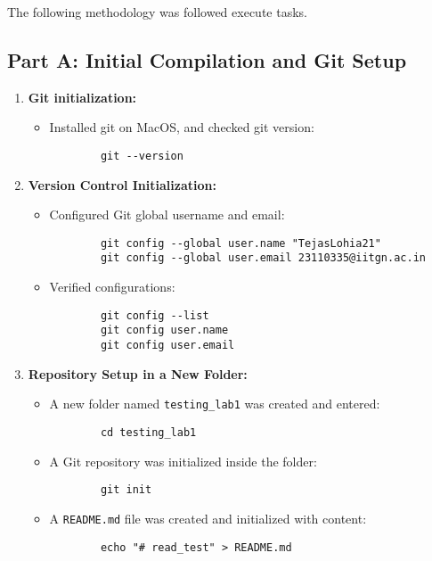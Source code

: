 \documentclass[12pt, a4paper]{report}
\begin{document}
The following methodology was followed execute tasks.
\subsection*{Part A: Initial Compilation and Git Setup}

\begin{enumerate}
    \item \textbf{Git initialization:}
    \begin{itemize}
        \item Installed git on MacOS, and checked git version:
        \begin{verbatim}
        git --version
        \end{verbatim}
    \end{itemize}

    \item \textbf{Version Control Initialization:}
    \begin{itemize}
        \item Configured Git global username and email:
        \begin{verbatim}
        git config --global user.name "TejasLohia21"
        git config --global user.email 23110335@iitgn.ac.in
        \end{verbatim}

        \item Verified configurations:
        \begin{verbatim}
        git config --list
        git config user.name
        git config user.email
        \end{verbatim}
    \end{itemize}

    \item \textbf{Repository Setup in a New Folder:}
    \begin{itemize}
        \item A new folder named \texttt{testing\_lab1} was created and entered:
        \begin{verbatim}
        cd testing_lab1
        \end{verbatim}

        \item A Git repository was initialized inside the folder:
        \begin{verbatim}
        git init
        \end{verbatim}

        \item A \texttt{README.md} file was created and initialized with content:
        \begin{verbatim}
        echo "# read_test" > README.md
        \end{verbatim}


\end{itemize}
\end{enumerate}
\end{document}
